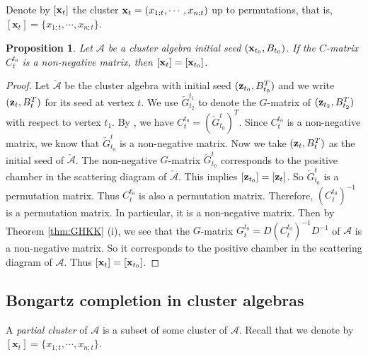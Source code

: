 \documentclass[10pt]{amsart}
\newtheorem{proposition}[theorem]{Proposition}
\theoremstyle{definition}
\theoremstyle{remark}
\numberwithin{equation}{section}
\begin{document}
Denote by $[{\bf x}_t]$ the cluster ${\bf x}_t=(x_{1;t},\cdots,x_{n;t})$ up to permutations, that is, $[\mathbf{x}_t]=\{x_{1;t},\cdots,x_{n;t}\}$.
\begin{proposition}\label{prop:C-positive}
  Let $\mathcal A$ be a cluster algebra initial seed $({\bf x}_{t_0}, B_{t_0})$. If the $C$-matrix $C_t^{t_0}$ is a non-negative matrix, then $[{\bf x}_t]=[{\bf x}_{t_0}]$.
\end{proposition}
\begin{proof}
 Let $\check{\mathcal A}$ be the cluster algebra with initial seed $({\bf z}_{t_0}, B_{t_0}^T)$ and we write $({\bf z}_t, B_t^T)$ for its seed at vertex $t$. We use $\check G_{t_2}^{t_1}$ to denote the $G$-matrix of $({\bf z}_{t_2}, B_{t_2}^T)$ with respect to vertex $t_1$. By \cite[(1.13)]{NZ12}, we have $C_{t}^{t_0}=(\check G_{t_0}^t)^T$. Since $C_t^{t_0}$ is a non-negative matrix, we know that $\check G_{t_0}^t$ is a non-negative matrix. Now we take $({\bf z}_t, B_t^T)$ as the initial seed of $\check{\mathcal A}$. The non-negative $G$-matrix $\check G_{t_0}^t$ corresponds to the positive chamber in the scattering diagram \cite{GHKK18} of $\check{\mathcal A}$. This implies 
 $[{\bf z}_{t_0}]=[{\bf z}_t]$. So $\check G_{t_0}^t$ is a permutation matrix. Thus $C_{t}^{t_0}$ is also a permutation matrix. Therefore, $(C_{t}^{t_0})^{-1}$ is a permutation matrix. In particular, it is a non-negative matrix.
Then by Theorem \ref{thm:GHKK} (i), we see that the $G$-matrix $G_t^{t_0}=D(C_{t}^{t_0})^{-1}D^{-1}$ of $\mathcal A$ is a non-negative matrix. So it corresponds to the positive chamber in the scattering diagram of $\mathcal A$. Thus $[{\bf x}_t]=[{\bf x}_{t_0}]$.
\end{proof}



\subsection{Bongartz completion in cluster algebras} A {\em partial cluster} of $\mathcal A$ is a subset of some cluster of $\mathcal A$. Recall that we denote by $[\mathbf{x}_t]=\{x_{1;t},\cdots,x_{n;t}\}$.  
\end{document}
